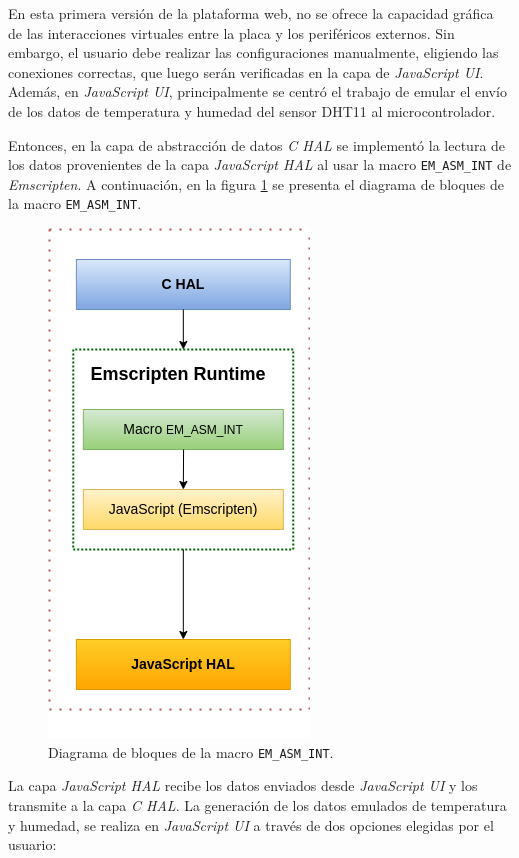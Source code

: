 En esta primera versión de la plataforma web, no se ofrece la capacidad gráfica de las interacciones virtuales entre la placa y los periféricos externos. Sin embargo, el usuario debe realizar las configuraciones manualmente, eligiendo las conexiones correctas, que luego serán verificadas en la capa de \textit{JavaScript UI}.
Además, en \textit{JavaScript UI}, principalmente se centró el trabajo de emular el envío de los datos de temperatura y humedad del sensor DHT11 al microcontrolador.


Entonces, en la capa de abstracción de datos \textit{C HAL} se implementó la lectura de los datos provenientes de la capa \textit{JavaScript HAL} al usar la macro \texttt{EM\_ASM\_INT} de \textit{Emscripten}. A continuación, en la figura \ref{fig:dht11Emscripten} se presenta el diagrama de bloques de la macro \texttt{EM\_ASM\_INT}.

\begin{figure}[ht]
	\centering
	\includegraphics[scale=.53]{./Figures/dht11Emscripten.png}
	\caption{Diagrama de bloques de la macro \texttt{EM\_ASM\_INT}.}
	\label{fig:dht11Emscripten}
\end{figure}

La capa \textit{JavaScript HAL} recibe los datos enviados desde \textit{JavaScript UI} y los transmite a la capa \textit{C HAL}. La generación de los datos  emulados de temperatura y humedad, se realiza en \textit{JavaScript UI} a través de dos opciones elegidas por el usuario:
 
